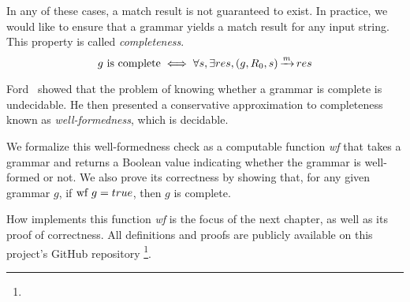 In any of these cases,
a match result is not guaranteed to exist.
In practice,
we would like to ensure that
a grammar yields a match result
for any input string.
This property is called \emph{completeness}.
\begin{equation}
    \text{$g$ is complete} \iff
    \forall s, \exists res, \Matches{g}{\PNT{0}}{s}{res}
\end{equation}

Ford~\cite{ford_parsing_2004} showed that
the problem of knowing whether a grammar
is complete is undecidable.
He then presented a conservative approximation
to completeness known as \emph{well-formedness},
which is decidable.

We formalize this well-formedness check
as a computable function \textit{wf}
that takes a grammar and returns a Boolean value
indicating whether the grammar is well-formed or not.
We also prove its correctness by showing that,
for any given grammar $g$,
if $\text{wf}\ g = true$,
then $g$ is complete.

How \lpeg{} implements this function \textit{wf}
is the focus of the next chapter,
as well as its proof of correctness.
All definitions and proofs
are publicly available on this project's GitHub repository%
\footnote{}.
